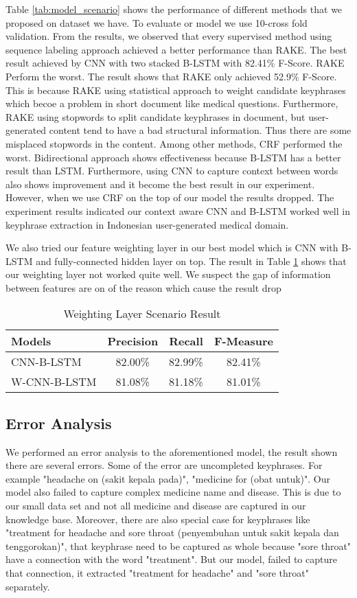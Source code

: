 Table \ref{tab:model_scenario} shows the performance of different methods that we proposed on dataset we have. To evaluate or model we use 10-cross fold validation. From the results, we observed that every supervised method using sequence labeling approach achieved a better performance than RAKE. The best result achieved by CNN with two stacked B-LSTM with 82.41\% F-Score. RAKE Perform the worst. The result shows that RAKE only achieved 52.9\% F-Score. This is because RAKE using statistical approach to weight candidate keyphrases which becoe a problem in short document like medical questions. Furthermore, RAKE using stopwords to split candidate keyphrases in document, but user-generated content tend to have a bad structural information. Thus there are some misplaced stopwords in the content. Among other methods, CRF performed the worst. Bidirectional approach shows effectiveness because B-LSTM has a better result than LSTM. Furthermore, using CNN to capture context between words also shows improvement and it become the best result in our experiment. However, when we use CRF on the top of our model the results dropped. The experiment results indicated our context aware CNN and B-LSTM worked well in keyphrase extraction in Indonesian user-generated medical domain. 

We also tried our feature weighting layer in our best model which is CNN with B-LSTM and fully-connected hidden layer on top. The result in Table \ref{tab:weighting_scenario} shows that our weighting layer not worked quite well. We suspect the gap of information between features are on of the reason which cause the result drop
\begin{table}
	\caption{Weighting Layer Scenario Result}
	\label{tab:weighting_scenario}
	\begin{tabular}{lccc}
		\toprule
		Models&Precision&Recall&F-Measure\\
		\midrule
		CNN-B-LSTM & 82.00\% & 82.99\% & 82.41\% \\
		
		W-CNN-B-LSTM & 81.08\% & 81.18\% & 81.01\% \\
		\bottomrule
	\end{tabular}
\end{table}
\subsection{Error Analysis}
We performed an error analysis to the aforementioned model, the result shown there are several errors. Some of the error are uncompleted keyphrases. For example "headache on (sakit kepala pada)", "medicine for (obat untuk)". Our model also failed to capture complex medicine name and disease. This is due to our small data set and not all medicine and disease are captured in our knowledge base. Moreover, there are also special case for keyphrases like "treatment for headache and sore throat (penyembuhan untuk sakit kepala dan tenggorokan)", that keyphrase need to be captured as whole because "sore throat" have a connection with the word "treatment". But our model, failed to capture that connection, it extracted "treatment for headache" and "sore throat" separately.
